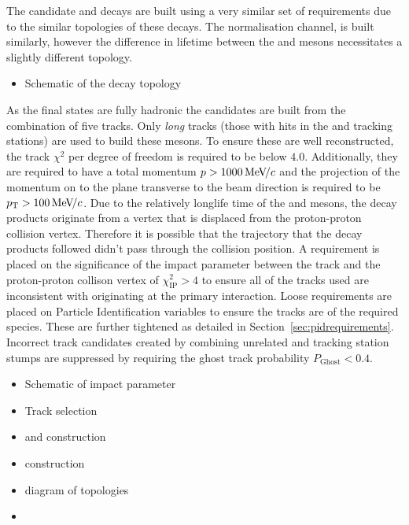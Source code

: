 The candidate \decay{\Bp}{\Dsp\phiz} and \decay{\Bp}{\Dsp\Kp\Km} decays are built using a very similar set of requirements due to the similar topologies of these decays. The normalisation channel, \decay{\Bp}{\Dsp\Dzb} is built similarly, however the difference in lifetime between the \Dzb and \phiz mesons necessitates a slightly different topology. 
{\color{Green}
\begin{itemize}
\item Schematic of the decay topology
\end{itemize}
}
As the final states are fully hadronic the candidates are built from the combination of five tracks. Only \emph{long} tracks (those with hits in the \velo and tracking stations) are used to build these mesons. To ensure these are well reconstructed, the track $\chi^{2}$ per degree of freedom is required to be below $4.0$. Additionally, they are required to have a total momentum $\mbox{$p$} > 1000 {\mathrm{\,Me\kern -0.1em V\!/}c}$ and the projection of the momentum on to the plane transverse to the beam direction is required to be $\mbox{$p_{\mathrm{ T}}$} > 100 {\mathrm{\,Me\kern -0.1em V\!/}c}$.
Due to the relatively longlife time of the \Bp and \D mesons, the decay products originate from a vertex that is displaced from the proton-proton collision vertex. Therefore it is possible that the trajectory that the decay products followed didn't pass through the collision position. A requirement is placed on the significance of the impact parameter between the track and the proton-proton collison vertex of $\chi^{2}_{\text{IP}} > 4$ to ensure all of the tracks used are inconsistent with originating at the primary interaction.    
Loose requirements are placed on Particle Identification variables to ensure the tracks are of the required species. These are further tightened as detailed in Section~\ref{sec:pidrequirements}. Incorrect track candidates created by combining unrelated \velo and tracking station stumps are suppressed by requiring the ghost track probability $P_{\text{Ghost}} < 0.4$. 



{\color{Green}
\begin{itemize}
\item Schematic of impact parameter
\end{itemize}
}

{\color{Red}
\begin{itemize}
\item Track selection
\item \Dsp and \phiz construction 
\item \Bp construction 
\item diagram of topologies
\item 
\end{itemize}
}




